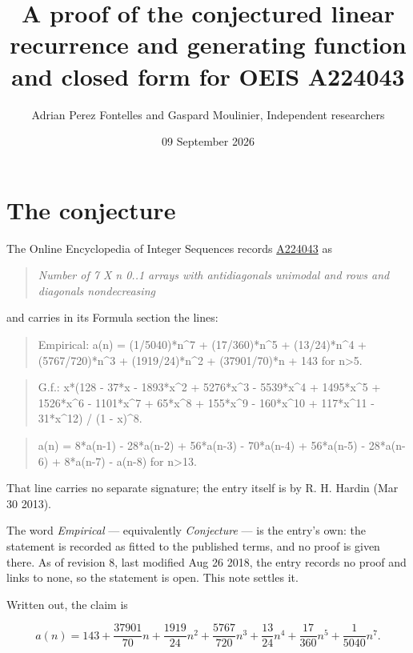 \documentclass[11pt]{article}
\title{A proof of the conjectured linear recurrence and generating function and closed form for OEIS A224043}
\author{Adrian Perez Fontelles and Gaspard Moulinier, Independent researchers}
\date{09 September 2026}
\theoremstyle{definition}
\begin{document}
\maketitle
\section{The conjecture}

The Online Encyclopedia of Integer Sequences records \href{https://oeis.org/A224043}{A224043} as

\begin{quote}\itshape Number of 7 X n 0..1 arrays with antidiagonals unimodal and rows and diagonals nondecreasing\end{quote}

and carries in its Formula section the lines:

\begin{quote}\ttfamily Empirical: a(n) = (1/5040)*n\textasciicircum{}7 + (17/360)*n\textasciicircum{}5 + (13/24)*n\textasciicircum{}4 + (5767/720)*n\textasciicircum{}3 + (1919/24)*n\textasciicircum{}2 + (37901/70)*n + 143 for n>5.\end{quote}

\begin{quote}\ttfamily G.f.: x*(128 - 37*x - 1893*x\textasciicircum{}2 + 5276*x\textasciicircum{}3 - 5539*x\textasciicircum{}4 + 1495*x\textasciicircum{}5 + 1526*x\textasciicircum{}6 - 1101*x\textasciicircum{}7 + 65*x\textasciicircum{}8 + 155*x\textasciicircum{}9 - 160*x\textasciicircum{}10 + 117*x\textasciicircum{}11 - 31*x\textasciicircum{}12) / (1 - x)\textasciicircum{}8.\end{quote}

\begin{quote}\ttfamily a(n) = 8*a(n-1) - 28*a(n-2) + 56*a(n-3) - 70*a(n-4) + 56*a(n-5) - 28*a(n-6) + 8*a(n-7) - a(n-8) for n>13.\end{quote}

That line carries no separate signature; the entry itself is by R. H. Hardin (Mar 30 2013).

The word {\itshape Empirical} --- equivalently {\itshape Conjecture} --- is the entry's own: the statement is recorded as fitted to the published terms, and no proof is given there. As of revision 8, last modified Aug 26 2018, the entry records no proof and links to none, so the statement is open. This note settles it.

Written out, the claim is

\[a(n) = 143 + \frac{37901}{70}n + \frac{1919}{24}n^{2} + \frac{5767}{720}n^{3} + \frac{13}{24}n^{4} + \frac{17}{360}n^{5} + \frac{1}{5040}n^{7}.\]
\end{document}
